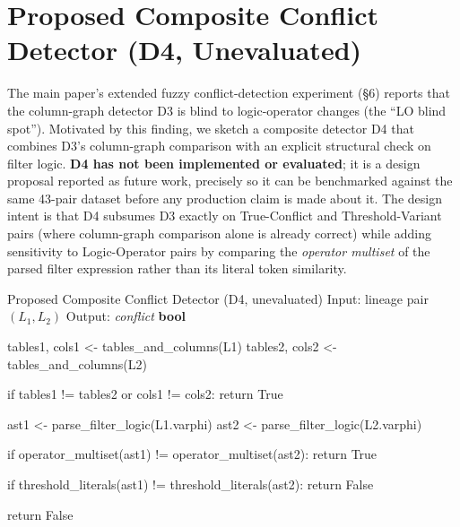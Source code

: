 \documentclass[9pt,twocolumn,twoside]{extarticle}
\begin{document}
\section{Proposed Composite Conflict Detector (D4, Unevaluated)}
\label{sec:supp-d4}
The main paper's extended fuzzy conflict-detection experiment (\S6) reports
that the column-graph detector D3 is blind to logic-operator changes (the
``LO blind spot''). Motivated by this finding, we sketch a composite
detector D4 that combines D3's column-graph comparison with an explicit
structural check on filter logic. \textbf{D4 has not been implemented or
evaluated}; it is a design proposal reported as future work, precisely so
it can be benchmarked against the same 43-pair dataset before any
production claim is made about it. The design intent is that D4 subsumes
D3 exactly on True-Conflict and Threshold-Variant pairs (where column-graph
comparison alone is already correct) while adding sensitivity to
Logic-Operator pairs by comparing the \emph{operator multiset} of the
parsed filter expression rather than its literal token similarity.

\begin{algorithmbox}[label={alg:composite}]{Proposed Composite Conflict Detector (D4, unevaluated)}{%
  \textnormal{Input: lineage pair $(L_1, L_2)$} \quad Output: \textit{conflict} \textbf{bool}}

tables1, cols1 <- tables_and_columns(L1)
tables2, cols2 <- tables_and_columns(L2)

if tables1 != tables2 or cols1 != cols2:
  return True                        %

ast1 <- parse_filter_logic(L1.varphi)  %
ast2 <- parse_filter_logic(L2.varphi)

if operator_multiset(ast1) != operator_multiset(ast2):
  return True                        %

if threshold_literals(ast1) != threshold_literals(ast2):
  return False                       %

return False                         %
\end{algorithmbox}
\end{document}
